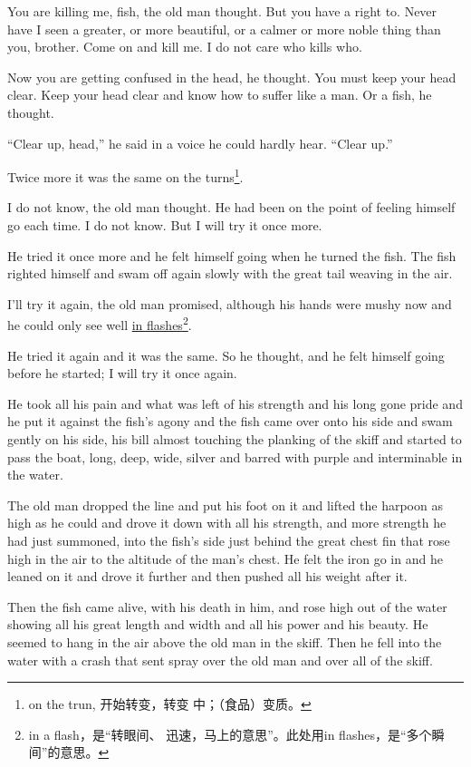 \documentclass[fontset=ubuntu,zihao=-4]{ctexrep}
\newlength{\drop}%
\begin{document}
You are killing me, fish, the old man thought. But you have a right to.
Never have I seen a greater, or more beautiful, or a calmer or more noble
thing than you, brother. Come on and kill me. I do not care who kills who.

Now you are getting \gls{confused} in the head, he thought. You must keep your
head clear. Keep your head clear and know how to \gls{suffer} like a man. Or a
fish, he thought.

``Clear up, head,'' he said in a voice he could hardly hear. ``Clear up.''

Twice more it was the same on the turns\footnote{on the trun, 开始转变，转变
  中；（食品）变质。}.

I do not know, the old man thought. He had been on the point of feeling
himself go each time. I do not know. But I will try it once more.

He tried it once more and he felt himself going when he turned the fish. The
fish righted himself and swam off again slowly with the great tail weaving
in the air.

I'll try it again, the old man promised, although his hands were \gls{mushy}
now and he could only see well \uline{in flashes}\footnote{in a flash，是“转眼间、
  迅速，马上的意思”。此处用in flashes，是“多个瞬间”的意思。}.

He tried it again and it was the same. So he thought, and he felt himself
going before he started; I will try it once again.

He took all his pain and what was left of his strength and his long gone
pride and he put it against the fish's \gls{agony} and the fish came over
onto his side and swam gently on his side, his bill almost touching the
planking of the skiff and started to pass the boat, long, deep, wide, silver
and \gls{barred} with purple and \gls{interminable} in the water.

The old man dropped the line and put his foot on it and lifted the harpoon
as high as he could and drove it down with all his strength, and more
strength he had just \gls{summoned}, into the fish's side just behind the
great \gls{chest} fin that rose high in the air to the \gls{altitude} of the
man's chest. He felt the \gls{iron} go in and he leaned on it and drove it
further and then pushed all his weight after it.

Then the fish came alive, with his death in him, and rose high out of the
water showing all his great length and width and all his power and his
beauty. He seemed to \gls{hang} in the air above the old man in the skiff.
Then he fell into the water with a crash that sent \gls{spray} over the old
man and over all of the skiff.
\end{document}
